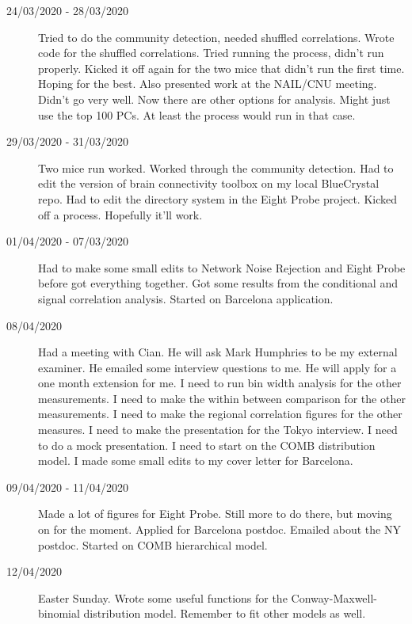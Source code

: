 \documentclass[a4paper,12pt]{article}
\theoremstyle{definition}
\begin{document}
\begin{description}
                                \item[24/03/2020 - 28/03/2020] Tried to do the community detection, needed shuffled correlations. Wrote code for the shuffled correlations. Tried running the process, didn't run properly. Kicked it off again for the two mice that didn't run the first time. Hoping for the best. Also presented work at the NAIL/CNU meeting. Didn't go very well. Now there are other options for analysis. Might just use the top 100 PCs. At least the process would run in that case.

                                \item[29/03/2020 - 31/03/2020] Two mice run worked. Worked through the community detection. Had to edit the version of brain connectivity toolbox on my local BlueCrystal repo. Had to edit the directory system in the Eight Probe project. Kicked off a process. Hopefully it'll work.

                                \item[01/04/2020 - 07/03/2020] Had to make some small edits to Network Noise Rejection and Eight Probe before got everything together. Got some results from the conditional and signal correlation analysis. Started on Barcelona application.

                                \item[08/04/2020] Had a meeting with Cian. He will ask Mark Humphries to be my external examiner. He emailed some interview questions to me. He will apply for a one month extension for me. I need to run bin width analysis for the other measurements. I need to make the within between comparison for the other measurements. I need to make the regional correlation figures for the other measures. I need to make the presentation for the Tokyo interview. I need to do a mock presentation. I need to start on the COMB distribution model. I made some small edits to my cover letter for Barcelona.

                                \item[09/04/2020 - 11/04/2020] Made a lot of figures for Eight Probe. Still more to do there, but moving on for the moment. Applied for Barcelona postdoc. Emailed about the NY postdoc. Started on COMB hierarchical model.

                                \item[12/04/2020] Easter Sunday. Wrote some useful functions for the Conway-Maxwell-binomial distribution model. Remember to fit other models as well.


\end{description}
\end{document}
